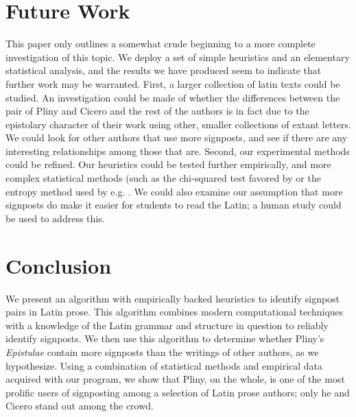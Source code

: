 \section{Future Work}
\label{sec:Future}

This paper only outlines a somewhat crude beginning to a more complete investigation of this topic. We deploy a set of simple heuristics and an elementary statistical analysis, and the results we have produced seem to indicate that further work may be warranted. First, a larger collection of latin texts could be studied. An investigation could be made of whether the differences between the pair of Pliny and Cicero and the rest of the authors is in fact due to the epistolary character of their work using other, smaller collections of extant letters. We could look for other authors that use more signposts, and see if there are any interesting relationships among those that are. Second, our experimental methods could be refined. Our heuristics could be tested further empirically, and more complex statistical methods (such as the chi-squared test favored by \cite{chi2} or the entropy method used by e.g. \cite{software}. We could also examine our assumption that more signposts do make it easier for students to read the Latin; a human study could be used to address this.

\section{Conclusion}
\label{sec:conclusion}

We present an algorithm with empirically backed heuristics to identify signpost pairs in Latin prose. This algorithm combines modern computational techniques with a knowledge of the Latin grammar and structure in question to reliably identify signposts. We then use this algorithm to determine whether Pliny's \textit{Epistulae} contain more signposts than the writings of other authors, as we hypothesize. Using a combination of statistical methods and empirical data acquired with our program, we show that Pliny, on the whole, is one of the most prolific users of signposting among a selection of Latin prose authors; only he and Cicero stand out among the crowd.
